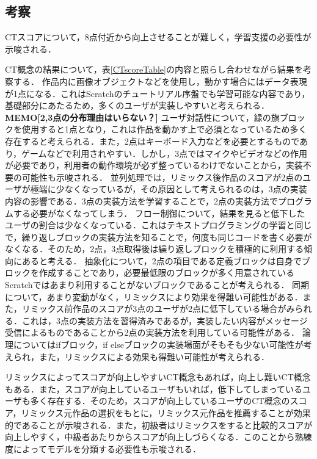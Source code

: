\documentclass[submit,techrep,noauthor]{ipsj}
\newcommand{\memo}[1]{\colorbox{magenta!30}{\textbf{MEMO}}{\color{red!50}\textbf{[#1]}}}
\begin{document}
\subsection{考察}
CTスコアについて，8点付近から向上させることが難しく，学習支援の必要性が示唆される．

CT概念の結果について，表\ref{CTscoreTable}の内容と照らし合わせながら結果を考察する．
作品内に画像オブジェクトなどを使用し，動かす場合にはデータ表現が1点になる．これはScratchのチュートリアル序盤でも学習可能な内容であり，基礎部分にあたるため，多くのユーザが実装しやすいと考えられる．\memo{2,3点の分布理由はいらない？}
ユーザ対話性について，緑の旗ブロックを使用すると1点となり，これは作品を動かす上で必須となっているため多く存在すると考えられる．また，2点はキーボード入力などを必要とするものであり，ゲームなどで利用されやすい．しかし，3点ではマイクやビデオなどの作用が必要であり，利用者の動作環境が必ず整っているわけでないことから，実装不要の可能性も示唆される．
並列処理では，リミックス後作品のスコアが2点のユーザが極端に少なくなっているが，その原因として考えられるのは，3点の実装内容の影響である．3点の実装方法を学習することで，2点の実装方法でプログラムする必要がなくなってしまう．
フロー制御について，結果を見ると低下したユーザの割合は少なくなっている．これはテキストプログラミングの学習と同じで，繰り返しブロックの実装方法を知ることで，何度も同じコードを書く必要がなくなる．そのため，2点，3点取得後は繰り返しブロックを積極的に利用する傾向にあると考える．
抽象化について，2点の項目である定義ブロックは自身でブロックを作成することであり，必要最低限のブロックが多く用意されているScratchではあまり利用することがないブロックであることが考えられる．
同期について，あまり変動がなく，リミックスにより効果を得難い可能性がある．また，リミックス前作品のスコアが3点のユーザが2点に低下している場合がみられる．これは，3点の実装方法を習得済みであるが，実装したい内容がメッセージ受信によるものであることから2点の実装方法を利用している可能性がある．
論理についてはifブロック，if elseブロックの実装場面がそもそも少ない可能性が考えられ，また，リミックスによる効果も得難い可能性が考えられる．

リミックスによってスコアが向上しやすいCT概念もあれば，向上し難いCT概念もある．また，スコアが向上しているユーザもいれば，低下してしまっているユーザも多く存在する．そのため，スコアが向上しているユーザのCT概念のスコア，リミックス元作品の選択をもとに，リミックス元作品を推薦することが効果的であることが示唆される．また，初級者はリミックスをすると比較的スコアが向上しやすく，中級者あたりからスコアが向上しづらくなる．このことから熟練度によってモデルを分類する必要性も示唆される．
\end{document}
